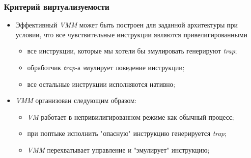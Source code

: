 \begin{frame}
\frametitle{Критерий виртуализуемости}
\begin{itemize}
  \item<1-> Эффективный \emph{VMM} может быть построен для заданной архитектуры
        при условии, что все чувствительные инструкции являются
        привелигированными
    \begin{itemize}
      \item все инструкции, которые мы хотели бы эмулировать генерируют
            \emph{trap};
      \item обработчик \emph{trap}-а эмулирует поведение инструкции;
      \item все остальные инструкции исполняются нативно;
    \end{itemize}
  \item<2-> \emph{VMM} организован следующим образом:
    \begin{itemize}
      \item \emph{VM} работает в непривилигированном режиме как обычный процесс;
      \item при поптыке исполнить "опасную" инструкцию генерируется \emph{trap};
      \item \emph{VMM} перехватывает управление и "эмулирует" инструкцию;
    \end{itemize}
\end{itemize}
\end{frame}
